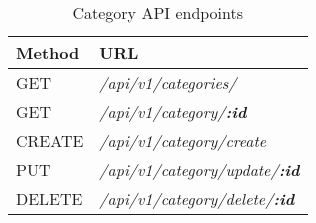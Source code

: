 \begin{table}[!h]
    \centering
    \caption{Category API endpoints}
    \label{tab:category-api}
    \begin{tabular}{|l|p{29em}|}
        \hline
        \textbf{Method} & \textbf{URL} \\
        \hline
        GET & \textit{/api/v1/categories/} \\
        \hline
        GET & \textit{/api/v1/category/\textbf{:id}} \\
        \hline
        CREATE & \textit{/api/v1/category/create} \\
        \hline
        PUT & \textit{/api/v1/category/update/\textbf{:id}} \\
        \hline
        DELETE & \textit{/api/v1/category/delete/\textbf{:id}} \\
        \hline
    \end{tabular}
\end{table}
